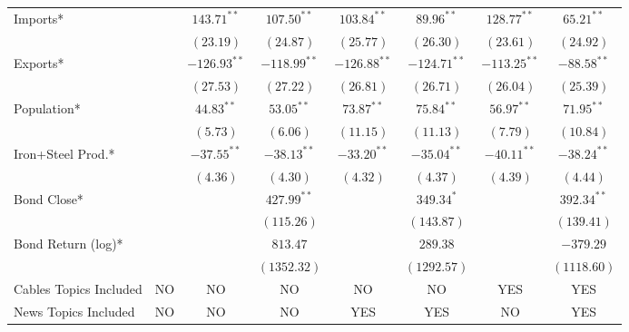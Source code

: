 \begin{table}
\begin{center}
\begin{footnotesize}
\begin{tabular}{l c c c c c c c}
Imports*               &               & $143.71^{**}$    & $107.50^{**}$    & $103.84^{**}$    & $89.96^{**}$     & $128.77^{**}$    & $65.21^{**}$     \\
                       &               & $(23.19)$        & $(24.87)$        & $(25.77)$        & $(26.30)$        & $(23.61)$        & $(24.92)$        \\
Exports*               &               & $-126.93^{**}$   & $-118.99^{**}$   & $-126.88^{**}$   & $-124.71^{**}$   & $-113.25^{**}$   & $-88.58^{**}$    \\
                       &               & $(27.53)$        & $(27.22)$        & $(26.81)$        & $(26.71)$        & $(26.04)$        & $(25.39)$        \\
Population*            &               & $44.83^{**}$     & $53.05^{**}$     & $73.87^{**}$     & $75.84^{**}$     & $56.97^{**}$     & $71.95^{**}$     \\
                       &               & $(5.73)$         & $(6.06)$         & $(11.15)$        & $(11.13)$        & $(7.79)$         & $(10.84)$        \\
Iron+Steel Prod.*      &               & $-37.55^{**}$    & $-38.13^{**}$    & $-33.20^{**}$    & $-35.04^{**}$    & $-40.11^{**}$    & $-38.24^{**}$    \\
                       &               & $(4.36)$         & $(4.30)$         & $(4.32)$         & $(4.37)$         & $(4.39)$         & $(4.44)$         \\
Bond Close*            &               &                  & $427.99^{**}$    &                  & $349.34^{*}$     &                  & $392.34^{**}$    \\
                       &               &                  & $(115.26)$       &                  & $(143.87)$       &                  & $(139.41)$       \\
Bond Return (log)*     &               &                  & $813.47$         &                  & $289.38$         &                  & $-379.29$        \\
                       &               &                  & $(1352.32)$      &                  & $(1292.57)$      &                  & $(1118.60)$      \\
\hline
Cables Topics Included & NO            & NO               & NO               & NO               & NO               & YES              & YES              \\
News Topics Included   & NO            & NO               & NO               & YES              & YES              & NO               & YES              \\

\end{tabular}
\end{footnotesize}
\end{center}
\end{table}
